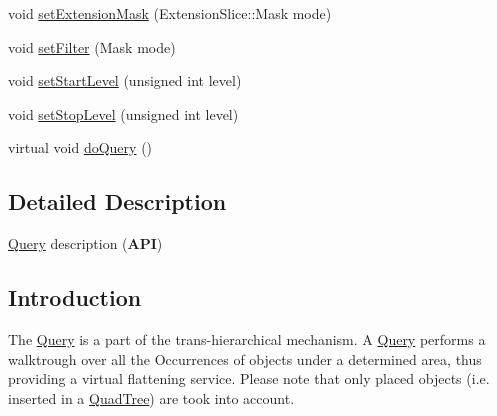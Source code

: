 \begin{DoxyCompactItemize}
void \hyperlink{classHurricane_1_1Query_af7f83fd3aefe1b5654f9bdd3566fe0d4}{set\+Extension\+Mask} (Extension\+Slice\+::\+Mask mode)
\item 
void \hyperlink{classHurricane_1_1Query_a457a0cda5ea5ad849a46aefce2514963}{set\+Filter} (Mask mode)
\item 
void \hyperlink{classHurricane_1_1Query_a8c4bc1bcfae942042ccb90a46b6fb510}{set\+Start\+Level} (unsigned int level)
\item 
void \hyperlink{classHurricane_1_1Query_a70359c71d7dc7e3f17d0a29c8208c92f}{set\+Stop\+Level} (unsigned int level)
\item 
virtual void \hyperlink{classHurricane_1_1Query_a2ca5bf71c7b35e14c4a64488a5e21bc6}{do\+Query} ()
\end{DoxyCompactItemize}


\subsection{Detailed Description}
\hyperlink{classHurricane_1_1Query}{Query} description ({\bfseries A\+PI}) 

\hypertarget{classHurricane_1_1Query_secQueryIntro}{}\subsection{Introduction}\label{classHurricane_1_1Query_secQueryIntro}
The \hyperlink{classHurricane_1_1Query}{Query} is a part of the trans-\/hierarchical mechanism. A \hyperlink{classHurricane_1_1Query}{Query} performs a walktrough over all the Occurrences of objects under a determined area, thus providing a virtual flattening service. Please note that only placed objects (i.\+e. inserted in a \hyperlink{classHurricane_1_1QuadTree}{Quad\+Tree}) are took into account.

